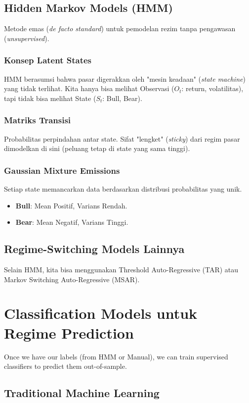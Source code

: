\documentclass[12pt,a4paper]{book}
\begin{document}
\section{Hidden Markov Models (HMM)}
Metode emas (\textit{de facto standard}) untuk pemodelan rezim tanpa pengawasan (\textit{unsupervised}).

\subsection{Konsep Latent States}
HMM berasumsi bahwa pasar digerakkan oleh "mesin keadaan" (\textit{state machine}) yang tidak terlihat. Kita hanya bisa melihat Observasi ($O_t$: return, volatilitas), tapi tidak bisa melihat State ($S_t$: Bull, Bear).

\subsection{Matriks Transisi}
Probabilitas perpindahan antar state. Sifat "lengket" (\textit{sticky}) dari regim pasar dimodelkan di sini (peluang tetap di state yang sama tinggi).

\subsection{Gaussian Mixture Emissions}
Setiap state memancarkan data berdasarkan distribusi probabilitas yang unik.
\begin{itemize}
    \item \textbf{Bull}: Mean Positif, Varians Rendah.
    \item \textbf{Bear}: Mean Negatif, Varians Tinggi.
\end{itemize}

\section{Regime-Switching Models Lainnya}
Selain HMM, kita bisa menggunakan Threshold Auto-Regressive (TAR) atau Markov Switching Auto-Regressive (MSAR).

\chapter{Classification Models untuk Regime Prediction}
Once we have our labels (from HMM or Manual), we can train supervised classifiers to predict them out-of-sample.

\section{Traditional Machine Learning}
\end{document}
